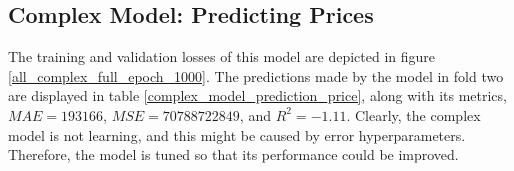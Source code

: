 \documentclass[12pt,twoside]{report}
\begin{document}
\subsection{Complex Model: Predicting Prices}
\label{complex_price}
The training and validation losses of this model are depicted in figure \ref{all_complex_full_epoch_1000}. The predictions made by the model in fold two are displayed in table \ref{complex_model_prediction_price}, along with its metrics, $MAE = 193166$, $MSE = 70788722849$, and $R^2 = -1.11$. Clearly, the complex model is not learning, and this might be caused by error hyperparameters. Therefore, the model is tuned so that its performance could be improved. 
\\
\begin{figure}[!htbp]
	\centering
	\hfill
	\hfill
	\hfil

\end{figure}
\end{document}
